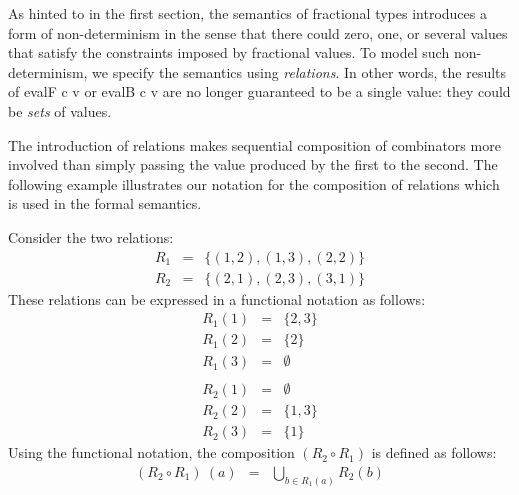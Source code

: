 \documentclass{llncs}
\begin{document}
As hinted to in the first section, the semantics of fractional types introduces
a form of non-determinism in the sense that there could zero, one, or several
values that satisfy the constraints imposed by fractional values. To model
such non-determinism, we specify the semantics using \emph{relations}. In
other words, the results of {{evalF c v}} or {{evalB c v}} are no longer
guaranteed to be a single value: they could be \emph{sets} of values.

The introduction of relations makes sequential composition of
combinators more involved than simply passing the value produced by
the first to the second. The following example illustrates our
notation for the composition of relations which is used in the formal
semantics. 

\begin{example}
Consider the two relations:
\[\begin{array}{rcl}                                                                       
R_1 &=& \{ (1,2),(1,3),(2,2) \} \\                                                       
R_2 &=& \{ (2,1),(2,3),(3,1) \}                                                          
\end{array}\]
These relations can be expressed in a functional notation as follows:
\[\begin{array}{rcl}                                                                       
R_1 (1) &=& \{ 2,3 \} \\                                                                 
R_1 (2) &=& \{ 2 \} \\                                                                   
R_1 (3) &=& \emptyset \\
\\ 
R_2 (1) &=& \emptyset \\                                                                 
R_2 (2) &=& \{ 1,3 \} \\                                                                 
R_2 (3) &=& \{ 1 \}                                                                      
\end{array}\]
Using the functional notation, the composition $(R_2 \circ R_1)$ is defined as
follows:
\[\begin{array}{rcl}                                                                   
(R_2 \circ R_1)~(a) &=& \bigcup_{b \in R_1(a)} R_2(b)                                  

\end{array}\]
\end{example}
\end{document}
